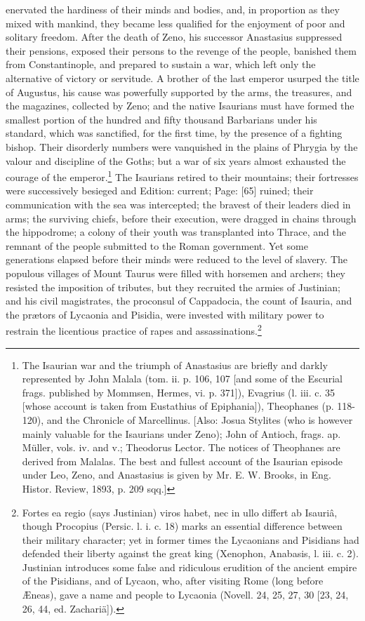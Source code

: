 enervated the hardiness of their minds and bodies, and, in proportion as they mixed with mankind, they became less qualified for the enjoyment of poor and solitary freedom. After the death of Zeno, his successor Anastasius suppressed their pensions, exposed their persons to the revenge of the people, banished them from Constantinople, and prepared to sustain a war, which left only the alternative of victory or servitude. A brother of the last emperor usurped the title of Augustus, his cause was powerfully supported by the arms, the treasures, and the magazines, collected by Zeno; and the native Isaurians must have formed the smallest portion of the hundred and fifty thousand Barbarians under his standard, which was sanctified, for the first time, by the presence of a fighting bishop. Their disorderly numbers were vanquished in the plains of Phrygia by the valour and discipline of the Goths; but a war of six years almost exhausted the courage of the emperor.\footnote{The Isaurian war and the triumph of Anastasius are briefly and darkly represented by John Malala (tom. ii. p. 106, 107 [and some of the Escurial frags. published by Mommsen, Hermes, vi. p. 371]), Evagrius (l. iii. c. 35 [whose account is taken from Eustathius of Epiphania]), Theophanes (p. 118-120), and the Chronicle of Marcellinus. [Also: Josua Stylites (who is however mainly valuable for the Isaurians under Zeno); John of Antioch, frags. ap. Müller, vols. iv. and v.; Theodorus Lector. The notices of Theophanes are derived from Malalas. The best and fullest account of the Isaurian episode under Leo, Zeno, and Anastasius is given by Mr. E. W. Brooks, in Eng. Histor. Review, 1893, p. 209 sqq.]} The Isaurians retired to their mountains; their fortresses were successively besieged and Edition: current; Page: [65] ruined; their communication with the sea was intercepted; the bravest of their leaders died in arms; the surviving chiefs, before their execution, were dragged in chains through the hippodrome; a colony of their youth was transplanted into Thrace, and the remnant of the people submitted to the Roman government. Yet some generations elapsed before their minds were reduced to the level of slavery. The populous villages of Mount Taurus were filled with horsemen and archers; they resisted the imposition of tributes, but they recruited the armies of Justinian; and his civil magistrates, the proconsul of Cappadocia, the count of Isauria, and the prætors of Lycaonia and Pisidia, were invested with military power to restrain the licentious practice of rapes and assassinations.\footnote{Fortes ea regio (says Justinian) viros habet, nec in ullo differt ab Isauriâ, though Procopius (Persic. l. i. c. 18) marks an essential difference between their military character; yet in former times the Lycaonians and Pisidians had defended their liberty against the great king (Xenophon, Anabasis, l. iii. c. 2). Justinian introduces some false and ridiculous erudition of the ancient empire of the Pisidians, and of Lycaon, who, after visiting Rome (long before Æneas), gave a name and people to Lycaonia (Novell. 24, 25, 27, 30 [23, 24, 26, 44, ed. Zachariä]).}


